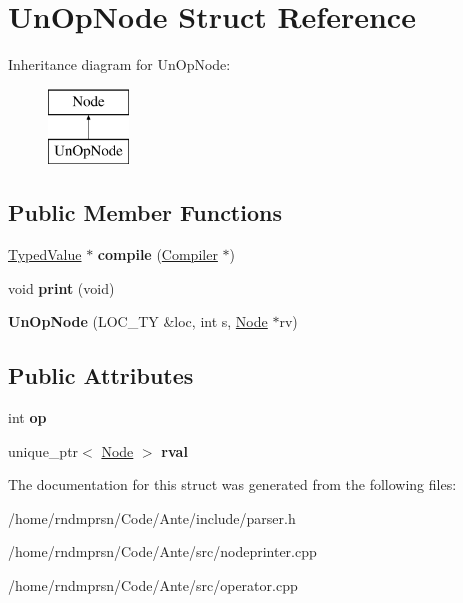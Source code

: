 \hypertarget{structUnOpNode}{}\section{Un\+Op\+Node Struct Reference}
\label{structUnOpNode}
Inheritance diagram for Un\+Op\+Node\+:\begin{figure}[H]
\begin{center}
\leavevmode
\includegraphics[height=2.000000cm]{structUnOpNode}
\end{center}
\end{figure}
\subsection*{Public Member Functions}
\begin{DoxyCompactItemize}
\item 
\mbox{\label{structUnOpNode_a0a570a75e468065b478ced418ed14696}} 
\hyperlink{structTypedValue}{Typed\+Value} $\ast$ {\bfseries compile} (\hyperlink{structante_1_1Compiler}{Compiler} $\ast$)
\item 
\mbox{\label{structUnOpNode_a327ad0e2af65eb26d38415d2aead7711}} 
void {\bfseries print} (void)
\item 
\mbox{\label{structUnOpNode_aa07d93d64491a2cd6e66a91a700d7a38}} 
{\bfseries Un\+Op\+Node} (L\+O\+C\+\_\+\+TY \&loc, int s, \hyperlink{structNode}{Node} $\ast$rv)
\end{DoxyCompactItemize}
\subsection*{Public Attributes}
\begin{DoxyCompactItemize}
\item 
\mbox{\label{structUnOpNode_a2a0c560fd8e6abf55e9d8627707283bf}} 
int {\bfseries op}
\item 
\mbox{\label{structUnOpNode_a7deb8c8cdb2146eacf7848b64778d553}} 
unique\+\_\+ptr$<$ \hyperlink{structNode}{Node} $>$ {\bfseries rval}
\end{DoxyCompactItemize}


The documentation for this struct was generated from the following files\+:\begin{DoxyCompactItemize}
\item 
/home/rndmprsn/\+Code/\+Ante/include/parser.\+h\item 
/home/rndmprsn/\+Code/\+Ante/src/nodeprinter.\+cpp\item 
/home/rndmprsn/\+Code/\+Ante/src/operator.\+cpp\end{DoxyCompactItemize}
